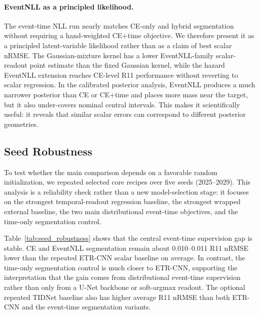 \documentclass[12pt]{article}
\begin{document}
\paragraph{EventNLL as a principled likelihood.}

The event-time NLL run nearly matches CE-only and hybrid segmentation without requiring a hand-weighted CE+time objective. We therefore present it as a principled latent-variable likelihood rather than as a claim of best scalar nRMSE. The Gaussian-mixture kernel has a lower EventNLL-family scalar-readout point estimate than the fixed Gaussian kernel, while the hazard EventNLL extension reaches CE-level R11 performance without reverting to scalar regression. In the calibrated posterior analysis, EventNLL produces a much narrower posterior than CE or CE+time and places more mass near the target, but it also under-covers nominal central intervals. This makes it scientifically useful: it reveals that similar scalar errors can correspond to different posterior geometries.

\subsection{Seed Robustness}

To test whether the main comparison depends on a favorable random initialization, we repeated selected core recipes over five seeds (2025--2029). This analysis is a reliability check rather than a new model-selection stage: it focuses on the strongest temporal-readout regression baseline, the strongest wrapped external baseline, the two main distributional event-time objectives, and the time-only segmentation control.

Table~\ref{tab:seed_robustness} shows that the central event-time supervision gap is stable. CE and EventNLL segmentation remain about 0.010--0.011 R11 nRMSE lower than the repeated ETR-CNN scalar baseline on average. In contrast, the time-only segmentation control is much closer to ETR-CNN, supporting the interpretation that the gain comes from distributional event-time supervision rather than only from a U-Net backbone or soft-argmax readout. The optional repeated TIDNet baseline also has higher average R11 nRMSE than both ETR-CNN and the event-time segmentation variants.
\end{document}
